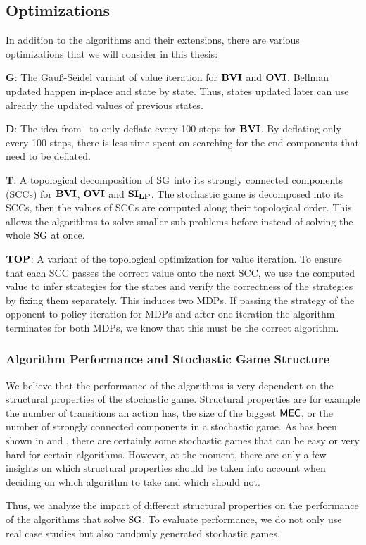 \subsection{Optimizations} \label{subsec:optimizations}
In addition to the algorithms and their extensions, there are various optimizations that we will consider in this thesis:

$\mathbf{G}$: The Gau{\ss}-Seidel variant of value iteration for $\mathbf{BVI}$ and $\mathbf{OVI}$. 
Bellman updated happen in-place and state by state. Thus, states updated later can use already the updated values of previous states. 

$\mathbf{D}$: The idea from~\cite{KKKW18} to only deflate every 100 steps for $\mathbf{BVI}$. 
By deflating only every 100 steps, there is less time spent on searching for the end components that need to be deflated.

$\mathbf{T}$: A topological decomposition of $\textrm{SG}$ into its strongly connected components (SCCs) for $\mathbf{BVI}$, $\mathbf{OVI}$ and $\mathbf{SI_{LP}}$.
The stochastic game is decomposed into its SCCs, then the values of SCCs are computed along their topological order.
This allows the algorithms to solve smaller sub-problems before instead of solving the whole $\textrm{SG}$ at once.

$\mathbf{TOP}$: A variant of the topological optimization for value iteration. 
To ensure that each SCC passes the correct value onto the next SCC, we use the computed value to infer strategies for the states and 
verify the correctness of the strategies by fixing them separately. This induces two MDPs. 
If passing the strategy of the opponent to policy iteration for MDPs and after one iteration the algorithm terminates for both MDPs,
we know that this must be the correct algorithm.

\subsubsection*{Algorithm Performance and Stochastic Game Structure}
We believe that the performance of the algorithms is very dependent on the structural properties of the stochastic game.
Structural properties are for example the number of transitions an action has, the size of the biggest $\mathsf{MEC}$, or the number of strongly connected components in a stochastic game.
As has been shown in \cite{GANDALFpaper} and \cite{haddadmonmege}, there are certainly some stochastic games that can be easy or very hard for certain algorithms.
However, at the moment, there are only a few insights on which structural properties should be taken into account when deciding on which algorithm to take and which should not.

Thus, we analyze the impact of different structural properties on the performance of the algorithms that solve $\textrm{SG}$.
To evaluate performance, we do not only use real case studies but also randomly generated stochastic games.